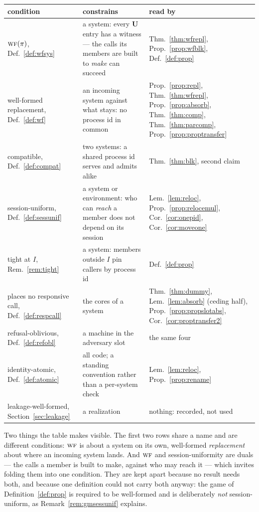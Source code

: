 \documentclass[11pt,a4paper]{article}
\newcommand{\uses}{\mathbf{U}}
\newcommand{\WF}{\op{wf}}
\newcommand{\op}[1]{\textsc{#1}}
\theoremstyle{accentdef}
\theoremstyle{accentplain}
\begin{document}
\begin{center}
\small
\begin{tabular}{@{}p{} p{} p{}@{}}
\toprule
condition & constrains & read by \\
\midrule
$\WF(\pi)$, Def.~\ref{def:wfsys}
  & a system: every $\uses$ entry has a witness --- the calls its members are built to \emph{make} can succeed
  & Thm.~\ref{thm:wfrepl}, Prop.~\ref{prop:wfblk}, Def.~\ref{def:prop} \\[0.6ex]
well-formed replacement, Def.~\ref{def:wf}
  & an incoming system against what stays: no process id in common
  & Prop.~\ref{prop:repl}, Thm.~\ref{thm:wfrepl}, Prop.~\ref{prop:absorb}, Thm.~\ref{thm:comp}, Thm.~\ref{thm:parcomp}, Prop.~\ref{prop:proptransfer} \\[0.6ex]
compatible, Def.~\ref{def:compat}
  & two systems: a shared process id serves and admits alike
  & Thm.~\ref{thm:blk}, second claim \\[0.6ex]
session-uniform, Def.~\ref{def:sessunif}
  & a system or environment: who can \emph{reach} a member does not depend on its session
  & Lem.~\ref{lem:reloc}, Prop.~\ref{prop:relocemul}, Cor.~\ref{cor:onepid}, Cor.~\ref{cor:moveone} \\[0.6ex]
tight at $I$, Rem.~\ref{rem:tight}
  & a system: members outside $I$ pin callers by process id
  & Def.~\ref{def:prop} \\[0.6ex]
places no responsive call, Def.~\ref{def:respcall}
  & the cores of a system
  & Thm.~\ref{thm:dummy}, Lem.~\ref{lem:absorb} (ceding half), Prop.~\ref{prop:propslotabs}, Cor.~\ref{cor:proptransfer2} \\[0.6ex]
refusal-oblivious, Def.~\ref{def:refobl}
  & a machine in the adversary slot
  & the same four \\[0.6ex]
identity-atomic, Def.~\ref{def:atomic}
  & all code; a standing convention rather than a per-system check
  & Lem.~\ref{lem:reloc}, Prop.~\ref{prop:rename} \\[0.6ex]
leakage-well-formed, Section~\ref{sec:leakage}
  & a realization
  & nothing: recorded, not used \\
\bottomrule
\end{tabular}
\end{center}

Two things the table makes visible. The first two rows share a name and are different conditions:
$\WF$ is about a system on its own, well-formed \emph{replacement} about where an incoming system
lands. And $\WF$ and session-uniformity are duals --- the calls a member is built to make, against who
may reach it --- which invites folding them into one condition. They are kept apart because no result
needs both, and because one definition could not carry both anyway: the game of
Definition~\ref{def:prop} is required to be well-formed and is deliberately \emph{not}
session-uniform, as Remark~\ref{rem:gmsessunif} explains.
\end{document}
